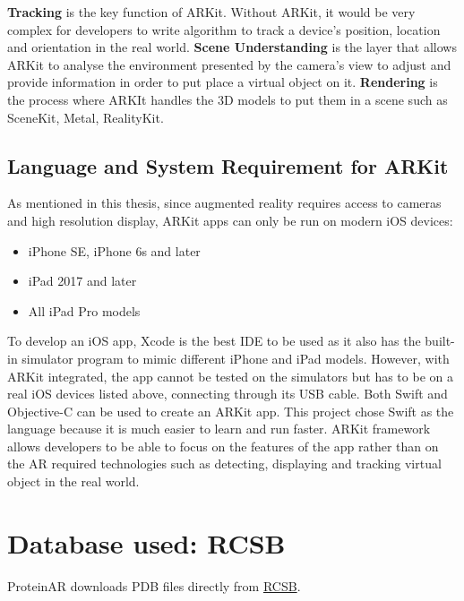 \textbf{Tracking} is the key function of ARKit. Without ARKit, it would be very complex for developers to write algorithm to track a device’s position, location and orientation in the real world.
\textbf{Scene Understanding} is the layer that allows ARKit to analyse the environment presented by the camera’s view to adjust and provide information in order to put place a virtual object on it. 
\textbf{Rendering} is the process where ARKIt handles the 3D models to put them in a scene such as SceneKit, Metal, RealityKit.

\subsection{Language and System Requirement for ARKit}
As mentioned in this thesis, since augmented reality requires access to cameras and high resolution display, ARKit apps can only be run on modern iOS devices: 
\begin{itemize}
	\item iPhone SE, iPhone 6s and later
	\item iPad 2017 and later
	\item All iPad Pro models
\end{itemize}
To develop an iOS app, Xcode is the best IDE to be used as it also has the built-in simulator program to mimic different iPhone and iPad models. However, with ARKit integrated, the app cannot be tested on the simulators but has to be on a real iOS devices listed above, connecting through its USB cable.
Both Swift and Objective-C can be used to create an ARKit app. This project chose Swift as the language because it is much easier to learn and run faster. 
ARKit framework allows developers to be able to focus on the features of the app rather than on the AR required technologies such as detecting, displaying and tracking virtual object in the real world. 


\section{Database used: RCSB}
ProteinAR downloads PDB files directly from \href{https://www.rcsb.org/}{RCSB}. 

